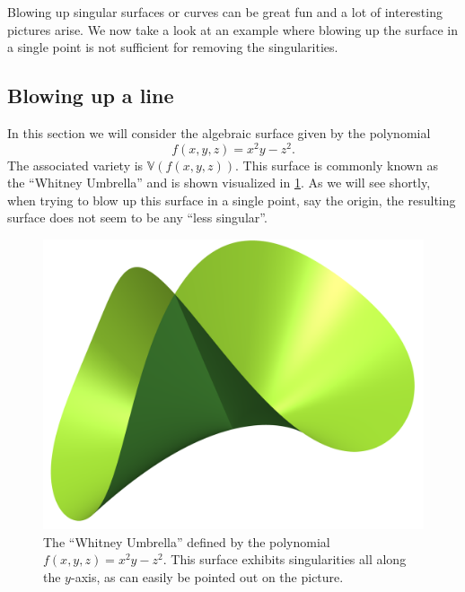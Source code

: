 \documentclass{article}
\newcommand{\V}{\ensuremath{\mathbb{V}}}
\begin{document}
    Blowing up singular surfaces or curves can be great fun and a lot of
    interesting pictures arise. We now take a look at an example where blowing
    up the surface in a single point is not sufficient for removing the
    singularities. 
    
    \subsection{Blowing up a line}
    \label{sub:blowing_up_a_line_of_singularity_}
    
    In this section we will consider the algebraic surface given by the
    polynomial 
    \begin{equation}
        \label{eq:whitney}
        f(x, y, z) = x^2y - z^2.
    \end{equation}
    The associated variety is $\V(f(x, y, z))$. This surface is commonly known
    as the ``Whitney Umbrella'' and is shown visualized in
    \cref{fig:whitney_umbrella}. As we will see shortly, when trying to blow up
    this surface in a single point, say the origin, the resulting surface does
    not seem to be any ``less singular''.
   
    \begin{figure}[h]
        \centering
        \includegraphics[width=0.3\linewidth]{pictures/blowup_line.png}
        \caption{The ``Whitney Umbrella'' defined by the polynomial $f(x, y, z)
        = x^2y - z^2$. This surface exhibits singularities all along the
        $y$-axis, as can easily be pointed out on the picture.}
        \label{fig:whitney_umbrella}
    \end{figure}
\end{document}
